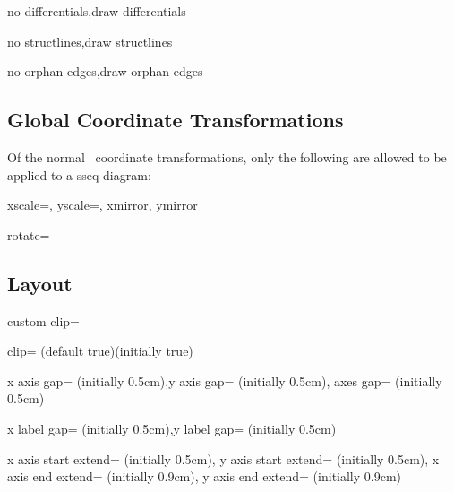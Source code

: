 \documentclass{ltxdoc}
\begin{document}
\begin{sseqdata}[name=ex1,degree={#1}{1-#1}]
\begin{keylist}{no differentials,draw differentials}
\end{keylist}

\begin{keylist}{no structlines,draw structlines}

\end{keylist}

\begin{keylist}{no orphan edges,draw orphan edges}

\end{keylist}

\subsection{Global Coordinate Transformations}
Of the normal \tikzname\ coordinate transformations, only the following are allowed to be applied to a sseq diagram:
\begin{keylist}{xscale=, yscale=, xmirror, ymirror}

\end{keylist}

\begin{key}{rotate=}

\end{key}

\subsection{Layout}
\begin{key}{custom clip=}

\end{key}

\begin{key}{clip= (default true)(initially true)}

\end{key}

\begin{keylist}{x axis gap= (initially 0.5cm),y axis gap= (initially 0.5cm), axes gap= (initially 0.5cm)}

\end{keylist}


\begin{keylist}{x label gap= (initially 0.5cm),y label gap= (initially 0.5cm)}

\end{keylist}

\begin{keylist}{x axis start extend= (initially 0.5cm), y axis start extend= (initially 0.5cm),
                x axis end extend= (initially 0.9cm), y axis end extend= (initially 0.9cm)}


\end{keylist}
\end{sseqdata}
\end{document}
